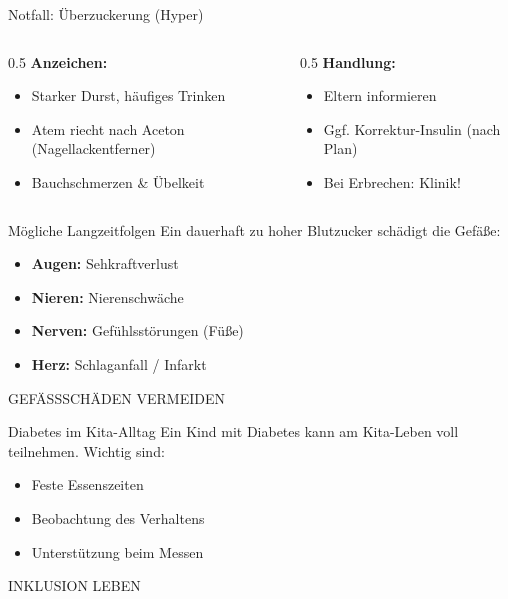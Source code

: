 \documentclass[10pt, aspectratio=169]{beamer}
\newcommand{\imagebox}[2]{%
	\begin{tcolorbox}[enhanced, colback=white, colframe=KitaBlue!20, arc=3mm, width=\textwidth, height=#1, valign=center, halign=center]
		\centering
		\vspace{0.5em}
		\scriptsize \color{KitaBlue!60} \MakeUppercase{#2}
	\end{tcolorbox}
}
\begin{document}
	\begin{frame}{Notfall: Überzuckerung (Hyper)}
		\begin{columns}
			\begin{column}{0.5\textwidth}
				\textbf{Anzeichen:}
				\begin{itemize}
					\item Starker Durst, häufiges Trinken
					\item Atem riecht nach Aceton (Nagellackentferner)
					\item Bauchschmerzen \& Übelkeit
				\end{itemize}
			\end{column}
			\begin{column}{0.5\textwidth}
				\textbf{Handlung:}
				\begin{itemize}
					\item Eltern informieren
					\item Ggf. Korrektur-Insulin (nach Plan)
					\item Bei Erbrechen: Klinik!
				\end{itemize}
			\end{column}
		\end{columns}
	\end{frame}
	
	\begin{frame}{Mögliche Langzeitfolgen}
		Ein dauerhaft zu hoher Blutzucker schädigt die Gefäße:
		\begin{itemize}
			\item \textbf{Augen:} Sehkraftverlust
			\item \textbf{Nieren:} Nierenschwäche
			\item \textbf{Nerven:} Gefühlsstörungen (Füße)
			\item \textbf{Herz:} Schlaganfall / Infarkt
		\end{itemize}
		\imagebox{3cm}{Gefäßschäden vermeiden}
	\end{frame}
	
	\begin{frame}{Diabetes im Kita-Alltag}
		Ein Kind mit Diabetes kann am Kita-Leben voll teilnehmen. Wichtig sind:
		\begin{itemize}
			\item Feste Essenszeiten
			\item Beobachtung des Verhaltens
			\item Unterstützung beim Messen
		\end{itemize}
		\vspace{1em}
		\imagebox{2.5cm}{Inklusion leben}
	\end{frame}
	
\end{document}

